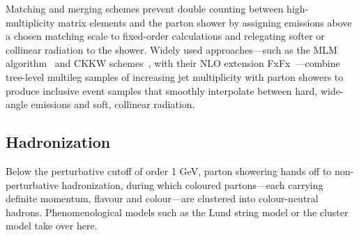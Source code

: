 Matching and merging schemes prevent double counting between high-multiplicity matrix elements and the parton shower by assigning emissions above a chosen matching scale to fixed-order calculations and relegating softer or collinear radiation to the shower. Widely used approaches—such as the MLM algorithm~\cite{MANGANO2002343} and CKKW schemes~\cite{Catani_2001}, with their NLO extension FxFx~\cite{Frederix_2012}—combine tree-level multileg samples
of increasing jet multiplicity with parton showers to produce inclusive event samples that smoothly interpolate between hard, wide-angle emissions and soft, collinear radiation.

\subsection*{Hadronization}
\label{subsec:Hadronization}

Below the perturbative cutoff of order 1 GeV, parton showering hands off to non-perturbative hadronization, during which coloured partons—each carrying definite momentum, flavour and colour—are clustered into colour-neutral hadrons. Phenomenological models such as the Lund string model or the cluster model take over here.

